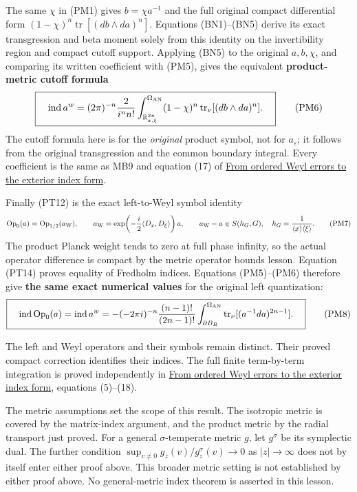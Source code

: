 \documentclass[
  11pt,
]{article}
\begin{document}
The same \(\chi\) in (PM1) gives \(b=\chi a^{-1}\) and the full original
compact differential form
\((1-\chi)^n\operatorname{tr}[(db\wedge da)^n]\). Equations (BN1)--(BN5)
derive its exact transgression and beta moment solely from this identity
on the invertibility region and compact cutoff support. Applying (BN5)
to the original \(a,b,\chi\), and comparing its written coefficient with
(PM5), gives the equivalent \textbf{product-metric cutoff formula} \[
 \boxed{\quad
 \operatorname{ind}a^w
 =(2\pi)^{-n}\frac{2}{i^n n!}
   \int_{\mathbb R^{2n}_{x,\xi}}^{\Omega_{\rm AN}}
       (1-\chi)^n
       \operatorname{tr}_{\nu}[(db\wedge da)^n].
 \quad}
 \tag{PM6}
\] The cutoff formula here is for the \emph{original} product symbol,
not for \(a_\varepsilon\); it follows from the original transgression
and the common boundary integral. Every coefficient is the same as MB9
and equation (17) of \href{ordered-weyl-exterior-reduction.pdf}{From
ordered Weyl errors to the exterior index form}.

Finally (PT12) is the exact left-to-Weyl symbol identity \[
 \operatorname{Op}_0(a)
  =\operatorname{Op}_{1/2}(a_{\rm W}),\qquad
 a_{\rm W}
   =\exp\!\left(-\frac{i}{2}
             \langle D_x,D_\xi\rangle\right)a,
 \qquad
 a_{\rm W}-a\in S(h_G,G),\quad
 h_G=\frac{1}{\langle x\rangle\langle\xi\rangle}.
 \tag{PM7}
\] The product Planck weight tends to zero at full phase infinity, so
the actual operator difference is compact by the metric operator bounds
lesson. Equation (PT14) proves equality of Fredholm indices. Equations
(PM5)--(PM6) therefore give \textbf{the same exact numerical values} for
the original left quantization: \[
 \boxed{\quad
 \operatorname{ind}\operatorname{Op}_0(a)
  =\operatorname{ind}a^w
  =-(-2\pi i)^{-n}\frac{(n-1)!}{(2n-1)!}
     \int_{\partial B_R}^{\Omega_{\rm AN}}
       \operatorname{tr}_{\nu}[(a^{-1}da)^{2n-1}] .
 \quad}
 \tag{PM8}
\]

The left and Weyl operators and their symbols remain distinct. Their
proved compact correction identifies their indices. The full finite
term-by-term integration is proved independently in
\href{ordered-weyl-exterior-reduction.pdf}{From ordered Weyl errors to
the exterior index form}, equations (5)--(18).

The metric assumptions set the scope of this result. The isotropic
metric is covered by the matrix-index argument, and the product metric
by the radial transport just proved. For a general \(\sigma\)-temperate
metric \(g\), let \(g^\sigma\) be its symplectic dual. The further
condition \(\sup_{v\ne0}g_z(v)/g_z^\sigma(v)\to0\) as \(|z|\to\infty\)
does not by itself enter either proof above. This broader metric setting
is not established by either proof above. No general-metric index
theorem is asserted in this lesson.
\end{document}
